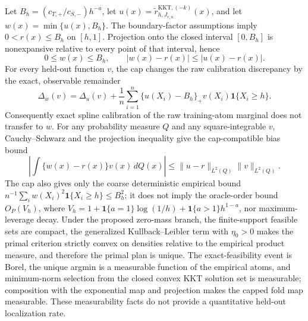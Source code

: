 Let \(B_h=(c_{T,+}/c_{S,-})h^{-a}\), let \(u(x)=\widetilde r^{\mathrm{KKT},(-k)}_{h,J_{r,n}}(x)\), and let \(w(x)=\min\{u(x),B_h\}\). The boundary-factor assumptions imply \(0<r(x)\le B_h\) on \([h,1]\). Projection onto the closed interval \([0,B_h]\) is nonexpansive relative to every point of that interval, hence
\[
0\le w(x)\le B_h,
\qquad
|w(x)-r(x)|\le |u(x)-r(x)|.
\]
For every held-out function \(v\), the cap changes the raw calibration discrepancy by the exact, observable remainder
\[
\Delta_{w}(v)=\Delta_{u}(v)+\frac1n\sum_{i=1}^n\{u(X_i)-B_h\}_{+}v(X_i)\mathbf 1\{X_i\ge h\}.
\]
Consequently exact spline calibration of the raw training-atom marginal does not transfer to \(w\). For any probability measure \(Q\) and any square-integrable \(v\), Cauchy--Schwarz and the projection inequality give the cap-compatible bias bound
\[
\left|\int\{w(x)-r(x)\}v(x)\,dQ(x)\right|
\le \|u-r\|_{L^2(Q)}\|v\|_{L^2(Q)}.
\]
The cap also gives only the coarse deterministic empirical bound \(n^{-1}\sum_iw(X_i)^2\mathbf 1\{X_i\ge h\}\le B_h^2\); it does not imply the oracle-order bound \(O_P(V_h)\), where \(V_h=1+\mathbf 1\{a=1\}\log(1/h)+\mathbf 1\{a>1\}h^{1-a}\), nor maximum-leverage decay. Under the proposed zero-mass branch, the finite-support feasible sets are compact, the generalized Kullback--Leibler term with \(\eta_0>0\) makes the primal criterion strictly convex on densities relative to the empirical product measure, and therefore the primal plan is unique. The exact-feasibility event is Borel, the unique argmin is a measurable function of the empirical atoms, and minimum-norm selection from the closed convex KKT solution set is measurable; composition with the exponential map and projection makes the capped fold map measurable. These measurability facts do not provide a quantitative held-out localization rate.